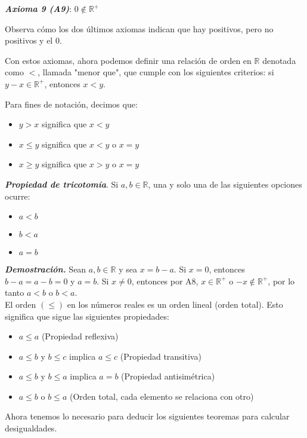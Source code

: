 \documentclass{report}
\begin{document}
    \begin{axBox}
        \textit{\textbf{Axioma 9 (A9)}}: $0 \not\in \mathbb{R}^+$
    \end{axBox}
    
    Observa cómo los dos últimos axiomas indican que hay positivos, pero no positivos y el $0$.
    
    Con estos axiomas, ahora podemos definir una relación de orden en $\mathbb{R}$ denotada como $<$, llamada "menor que", que cumple con los siguientes criterios: si $y-x \in \mathbb{R}^+$, entonces $x<y$.
    
    Para fines de notación, decimos que:
    
    \begin{itemize}
        \item $y>x$ significa que $x<y$
        \item $x \leq y$ significa que $x<y$ o $x=y$
        \item $x \geq y$ significa que $x>y$ o $x=y$
    \end{itemize}
    
    \begin{thBox}
        \textit{\textbf{Propiedad de tricotomía}}. Si $a, b \in \mathbb{R}$, una y solo una de las siguientes opciones ocurre:
    
        \begin{itemize}
            \item $a<b$
            \item $b<a$
            \item $a=b$
        \end{itemize}
    \end{thBox}

    \textit{\textbf{Demostración.}} Sean $a,b \in \mathbb{R}$ y sea $x = b - a$. Si $x = 0$, entonces $b-a=a-b=0$ y $a=b$. Si $x \neq 0$, entonces por A8, $x \in \mathbb{R}^+$ o $-x \not\in \mathbb{R}^+$, por lo tanto $a < b$ o $b < a$.\\
    El orden $(\leq)$ en los números reales es un orden lineal (orden total). Esto significa que sigue las siguientes propiedades:
    
    \begin{itemize}
        \item $a\leq a$ (Propiedad reflexiva)
        \item $a\leq b$ y $b\leq c$ implica $a \leq c$ (Propiedad transitiva)
        \item $a \leq b$ y $b \leq a$ implica $a = b$ (Propiedad antisimétrica)
        \item $a \leq b$ o $b \leq a$ (Orden total, cada elemento se relaciona con otro)
    \end{itemize}
    Ahora tenemos lo necesario para deducir los siguientes teoremas para calcular desigualdades.
    
\end{document}
